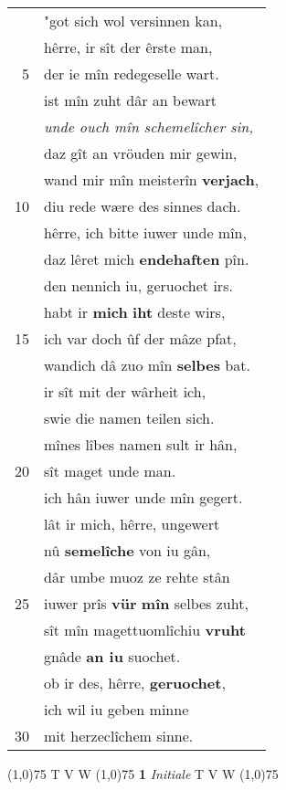 \documentclass[8pt,a4paper,notitlepage]{article}
\begin{document}
\begin{table}[ht]
\begin{minipage}[t]{0.5\linewidth}
\begin{tabular}{rl}
 & "got sich wol versinnen kan,\\ 
 & hêrre, ir sît der êrste man,\\ 
5 & der ie mîn redegeselle wart.\\ 
 & ist mîn zuht dâr an bewart\\ 
 & \textit{unde ouch mîn schemelîcher sin,}\\ 
 & daz gît an vröuden mir gewin,\\ 
 & wand mir mîn meisterîn \textbf{verjach},\\ 
10 & diu rede wære des sinnes dach.\\ 
 & hêrre, ich bitte iuwer unde mîn,\\ 
 & daz lêret mich \textbf{endehaften} pîn.\\ 
 & den nennich iu, geruochet irs.\\ 
 & habt ir \textbf{mich} \textbf{iht} deste wirs,\\ 
15 & ich var doch ûf der mâze pfat,\\ 
 & wandich dâ zuo mîn \textbf{selbes} bat.\\ 
 & ir sît mit der wârheit ich,\\ 
 & swie die namen teilen sich.\\ 
 & mînes lîbes namen sult ir hân,\\ 
20 & sît maget unde man.\\ 
 & ich hân iuwer unde mîn gegert.\\ 
 & lât ir mich, hêrre, ungewert\\ 
 & nû \textbf{semelîche} von iu gân,\\ 
 & dâr umbe muoz ze rehte stân\\ 
25 & iuwer prîs \textbf{vür} \textbf{mîn} selbes zuht,\\ 
 & sît mîn magettuomlîchiu \textbf{vruht}\\ 
 & gnâde \textbf{an iu} suochet.\\ 
 & ob ir des, hêrre, \textbf{geruochet},\\ 
 & ich wil iu geben minne\\ 
30 & mit herzeclîchem sinne.\\ 
\end{tabular}
\scriptsize
\line(1,0){75} \newline
T V W \newline
\line(1,0){75} \newline
\textbf{1} \textit{Initiale} T V W  \newline
\line(1,0){75} \newline

\end{minipage}
\end{table}
\end{document}
